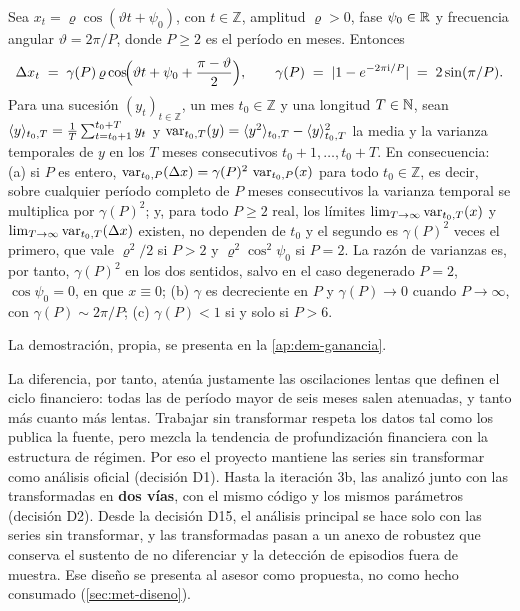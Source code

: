 \begin{proposicion}\label{prop:ganancia}
Sea $x_t=\varrho\cos(\vartheta t+\psi_0)$, con $t\in\mathbb{Z}$, amplitud $\varrho>0$, fase
$\psi_0\in\mathbb{R}$ y frecuencia angular $\vartheta=2\pi/P$, donde $P\ge 2$ es el período en meses.
Entonces
\begin{equation}\label{eq:ganancia}
  \Delta x_t \;=\; \gamma(P)\,\varrho\cos\!\Bigl(\vartheta t+\psi_0+\frac{\pi-\vartheta}{2}\Bigr),
  \qquad
  \gamma(P)\;=\;\lvert 1-e^{-2\pi\mathrm{i}/P}\rvert\;=\;2\sin(\pi/P).
\end{equation}
Para una sucesión $(y_t)_{t\in\mathbb{Z}}$, un mes $t_0\in\mathbb{Z}$ y una longitud
$T\in\mathbb{N}$, sean $\langle y\rangle_{t_0,T}=\frac1T\sum_{t=t_0+1}^{t_0+T}y_t$ y
$\operatorname{var}_{t_0,T}(y)=\langle y^2\rangle_{t_0,T}-\langle y\rangle_{t_0,T}^2$ la media y la varianza temporales de
$y$ en los $T$ meses consecutivos $t_0+1,\dots,t_0+T$. En consecuencia:
\textup{(a)} si $P$ es entero, $\operatorname{var}_{t_0,P}(\Delta x)=\gamma(P)^2\,\operatorname{var}_{t_0,P}(x)$ para todo
$t_0\in\mathbb{Z}$, es decir, sobre cualquier período completo de $P$ meses consecutivos la
varianza temporal se multiplica por $\gamma(P)^2$; y, para todo $P\ge2$ real, los límites
$\lim_{T\to\infty}\operatorname{var}_{t_0,T}(x)$ y $\lim_{T\to\infty}\operatorname{var}_{t_0,T}(\Delta x)$ existen, no
dependen de $t_0$ y el segundo es $\gamma(P)^2$ veces el primero, que vale $\varrho^2/2$ si $P>2$
y $\varrho^2\cos^2\psi_0$ si $P=2$. La razón de varianzas es, por tanto, $\gamma(P)^2$ en los dos
sentidos, salvo en el caso degenerado $P=2$, $\cos\psi_0=0$, en que $x\equiv0$; \textup{(b)} $\gamma$ es decreciente en $P$ y
$\gamma(P)\to 0$ cuando $P\to\infty$, con $\gamma(P)\sim 2\pi/P$; \textup{(c)} $\gamma(P)<1$
si y solo si $P>6$.
\end{proposicion}

La demostración, propia, se presenta en la \cref{ap:dem-ganancia}.

La diferencia, por tanto, atenúa justamente las oscilaciones lentas que definen el ciclo
financiero: todas las de período mayor de seis meses salen atenuadas, y tanto más cuanto más
lentas. Trabajar sin transformar respeta los datos tal como los publica la fuente, pero mezcla la
tendencia de profundización financiera con la estructura de régimen. Por eso el proyecto mantiene
las series sin transformar como análisis oficial (decisión D1). Hasta la iteración 3b, las analizó
junto con las transformadas en \textbf{dos vías}, con el mismo código y los mismos parámetros
(decisión D2). Desde la decisión D15, el análisis principal se hace solo con las series sin
transformar, y las transformadas pasan a un anexo de robustez que conserva el sustento de no
diferenciar y la detección de episodios fuera de muestra. Ese diseño se presenta al asesor como
propuesta, no como hecho consumado (\cref{sec:met-diseno}).

